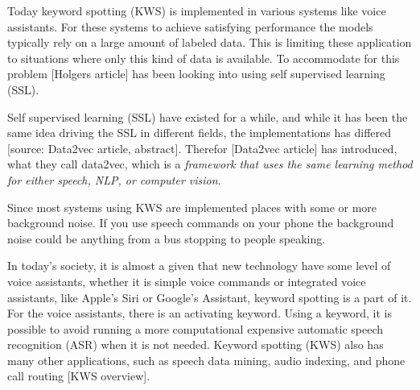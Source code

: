 Today keyword spotting (KWS) is implemented in various systems like voice assistants. For these systems to achieve satisfying performance the models typically rely on a large amount of labeled data. This is limiting these application to situations where only this kind of data is available. To accommodate for this problem [Holgers article] has been looking into using self supervised learning (SSL). 

Self supervised learning (SSL) have existed for a while, and while it has been the same idea driving the SSL in different fields, the implementations has differed [source: Data2vec article, abstract]. Therefor [Data2vec article] has introduced, what they call data2vec, which is a \textit{framework that uses the same learning method for either speech, NLP, or computer vision}.

Since most systems using KWS are implemented places with some or more background noise. If you use speech commands on your phone the background noise could be anything from a bus stopping to people speaking.

In today's society, it is almost a given that new technology have some level of voice assistants, whether it is simple voice commands or integrated voice assistants, like Apple's Siri or Google's Assistant, keyword spotting is a part of it. For the voice assistants, there is an activating keyword. Using a keyword, it is possible to avoid running a more computational expensive automatic speech recognition (ASR) when it is not needed. Keyword spotting (KWS) also has many other applications, such as speech data mining, audio indexing, and phone call routing [KWS overview]. 